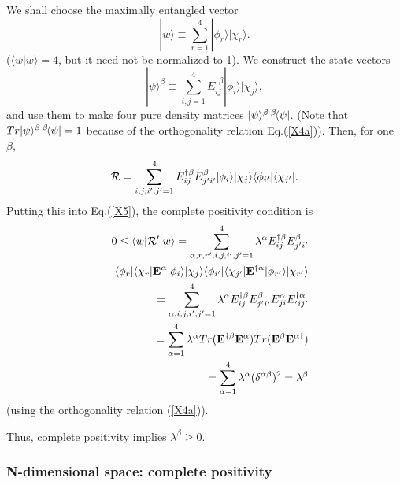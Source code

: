 \documentclass[aps,pra,amssymb, amsfonts,amsmath,showpacs, superscriptaddress,12pt]{revtex4}
\begin{document}
    We shall choose the maximally entangled vector
\begin{equation}
|w\rangle\equiv\sum_{r=1}^{4}|\phi_{r}\rangle |\chi_{r}\rangle. \nonumber
\end{equation}
\noindent ($\langle w|w\rangle=4$, but it need not be normalized to 1). We construct the state vectors 
\[
|\psi\rangle^{\beta}\equiv\sum_{i,j=1}^{4}E_{ij}^{\dagger\beta}|\phi_{i}\rangle |\chi_{j}\rangle, 
\]
\noindent and  use them to make  four pure density matrices $|\psi\rangle^{\beta}\thinspace^{\beta}\negthinspace\langle\psi|$. (Note that $Tr|\psi\rangle^{\beta}\thinspace^{\beta}\negthinspace\langle\psi|=1$ because of the orthogonality relation Eq.(\ref{X4a})).  Then, for one $\beta$,   
\[
{\cal R}=\sum_{i,j,i',j'=1}^{4}E_{ij}^{\dagger\beta}E_{j'i'}^{\beta}|\phi_{i}\rangle |\chi_{j}\rangle\langle\phi_{i'}|\langle \chi_{j'}|. 
\]
\noindent  Putting this into Eq.(\ref{X5}), the complete positivity condition is 
\begin{eqnarray}
&&0\leq\langle w|{\cal R}'|w\rangle= \sum_{\alpha, r,r',i,j,i',j'=1}^{4}\lambda^{\alpha}E_{ij}^{\dagger\beta}E_{j'i'}^{\beta}\nonumber\\
&&\langle\phi_{r}|\langle \chi_{r}|{\bf E}^{\alpha}|\phi_{i}\rangle |\chi_{j}\rangle\langle\phi_{i'}|\langle \chi_{j'}| {\bf E}^{\dagger\alpha}
|\phi_{r'}\rangle |\chi_{r'}\rangle\nonumber\\
&&=\sum_{\alpha,i,j,i',j'=1}^{4}\lambda^{\alpha}E_{ij}^{\dagger\beta}E_{j'i'}^{\beta}E_{ji}^{\alpha}E_{'ij'}^{\dagger\alpha}\nonumber\\
&&=\sum_{\alpha=1}^{4}\lambda^{\alpha}Tr({\bf E}^{\dagger\beta}{\bf E}^{\alpha})Tr({\bf E}^{\beta}{\bf E}^{\alpha\dagger})\nonumber\\
&&=\sum_{\alpha=1}^{4}\lambda^{\alpha}
(\delta^{\alpha\beta})^{2}=\lambda^{\beta}\nonumber
\end{eqnarray}
\noindent (using the orthogonality relation (\ref{X4a})).

Thus, complete positivity implies $\lambda^{\beta}\geq 0$. 

\subsubsection{N-dimensional space: complete positivity}
\end{document}
